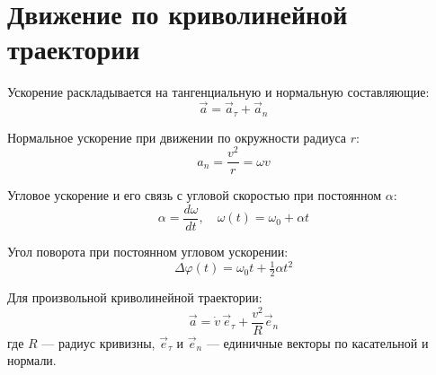 \documentclass{article}
\begin{document}
\section*{Движение по криволинейной траектории}

Ускорение раскладывается на тангенциальную и нормальную составляющие:
\[\vec a = \vec a_\tau + \vec a_n\]

Нормальное ускорение при движении по окружности радиуса $r$:
\[a_n = \frac{v^2}{r} = \omega v\]

Угловое ускорение и его связь с угловой скоростью при постоянном $\alpha$:
\[\alpha = \frac{d\omega}{dt}, \quad \omega(t) = \omega_0 + \alpha t\]

Угол поворота при постоянном угловом ускорении:
\[\Delta \varphi(t) = \omega_0t + \tfrac12\alpha t^2\]

Для произвольной криволинейной траектории:
\[\vec a = \dot v\,\vec e_\tau + \frac{v^2}{R}\vec e_n\]
где $R$ — радиус кривизны, $\vec e_\tau$ и $\vec e_n$ — единичные векторы по касательной и нормали.
\end{document}
